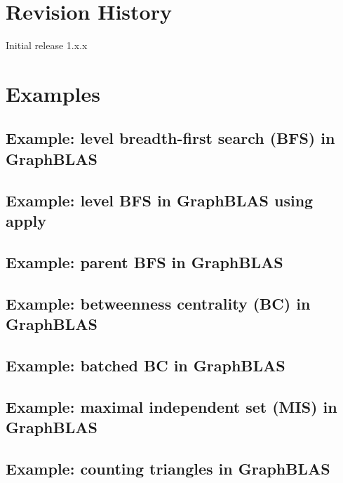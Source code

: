 \chapter{Revision History}
\label{Chp:RevHistory}

Initial release 1.x.x



\chapter{Examples}
\label{Chp:Examples}

\pagebreak
\nolinenumbers
\section{Example: level breadth-first search (BFS) in GraphBLAS}
{\scriptsize
%
}
\vfill

\pagebreak
\nolinenumbers
\section{Example: level BFS in GraphBLAS using apply}
{\scriptsize
%
}
\vfill

\pagebreak
\nolinenumbers
\section{Example: parent BFS in GraphBLAS}
{\scriptsize
%
}
\vfill

\pagebreak
\nolinenumbers
\section{Example: betweenness centrality (BC) in GraphBLAS}
\label{App:BCnobatch}
{\scriptsize
%
}
\vfill

\pagebreak
\nolinenumbers
\section{Example: batched BC in GraphBLAS}
{\scriptsize
%
}
\vfill

\pagebreak
\nolinenumbers
\section{Example: maximal independent set (MIS) in GraphBLAS}
{\scriptsize
%
}
\vfill

\pagebreak
\nolinenumbers
\section{Example: counting triangles in GraphBLAS}
{\scriptsize
%
}
\vfill
\pagebreak
